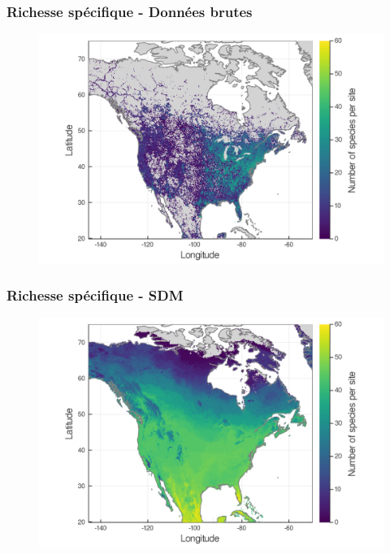 \documentclass[10pt]{beamer}
\begin{document}
\begin{frame}
  \frametitle{Richesse spécifique - Données brutes}
  \begin{figure}
    \centering
    \hspace*{-0cm}\includegraphics[scale=0.17]{fig/03_raw_richness.png}
  \end{figure}
\end{frame}

\begin{frame}
  \frametitle{Richesse spécifique - SDM}
  \begin{figure}
    \centering
    \hspace*{-0cm}\includegraphics[scale=0.17]{fig/03_sdm_richness.png}
  \end{figure}
\end{frame}
\end{document}
